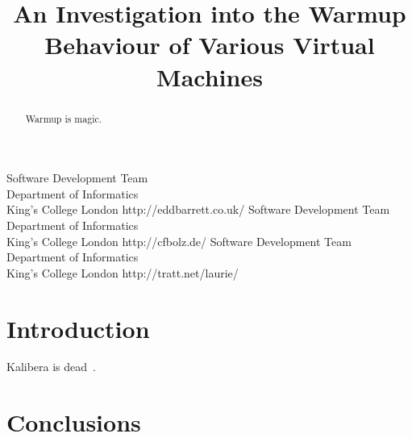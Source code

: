 \documentclass[10pt,preprint]{sigplanconf}
\begin{document}
\title{An Investigation into the Warmup Behaviour of Various Virtual Machines}
           {Software Development Team\\ Department of Informatics\\ King's College London}
           {http://eddbarrett.co.uk/}
           {Software Development Team\\ Department of Informatics\\ King's College London}
           {http://cfbolz.de/}
           {Software Development Team\\ Department of Informatics\\ King's College London}
           {http://tratt.net/laurie/}

\maketitle


\begin{abstract}
Warmup is magic.
\end{abstract}

\section{Introduction}
\label{sec:intro}

Kalibera is dead~\cite{kalibera13rigorous}.

\section{Conclusions}
\label{sec:conclusion}



\end{document}
